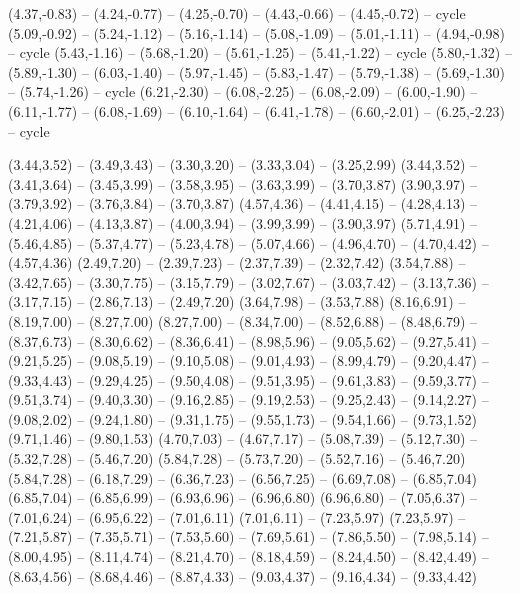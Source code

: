 \expandafter\def\csname geo:gebiet:HI\endcsname{
  (4.37,-0.83) -- (4.24,-0.77) -- (4.25,-0.70) -- (4.43,-0.66) -- (4.45,-0.72) -- cycle
  (5.09,-0.92) -- (5.24,-1.12) -- (5.16,-1.14) -- (5.08,-1.09) -- (5.01,-1.11) -- (4.94,-0.98) -- cycle
  (5.43,-1.16) -- (5.68,-1.20) -- (5.61,-1.25) -- (5.41,-1.22) -- cycle
  (5.80,-1.32) -- (5.89,-1.30) -- (6.03,-1.40) -- (5.97,-1.45) -- (5.83,-1.47) -- (5.79,-1.38) -- (5.69,-1.30) -- (5.74,-1.26) -- cycle
  (6.21,-2.30) -- (6.08,-2.25) -- (6.08,-2.09) -- (6.00,-1.90) -- (6.11,-1.77) -- (6.08,-1.69) -- (6.10,-1.64) -- (6.41,-1.78) -- (6.60,-2.01) -- (6.25,-2.23) -- cycle}
\def\GebietListe{AL,AR,AZ,CA,CO,CT,DC,DE,FL,GA,IA,ID,IL,IN,KS,KY,LA,MA,MD,ME,MI,MN,MO,MS,MT,NC,ND,NE,NH,NJ,NM,NV,NY,OH,OK,OR,PA,RI,SC,SD,TN,TX,UT,VA,VT,WA,WI,WV,WY,AK,HI}

\expandafter\def\csname geo:fluss:Colorado\endcsname{
  (3.44,3.52) -- (3.49,3.43) -- (3.30,3.20) -- (3.33,3.04) -- (3.25,2.99)
  (3.44,3.52) -- (3.41,3.64) -- (3.45,3.99) -- (3.58,3.95) -- (3.63,3.99) -- (3.70,3.87)
  (3.90,3.97) -- (3.79,3.92) -- (3.76,3.84) -- (3.70,3.87)
  (4.57,4.36) -- (4.41,4.15) -- (4.28,4.13) -- (4.21,4.06) -- (4.13,3.87) -- (4.00,3.94) -- (3.99,3.99) -- (3.90,3.97)
  (5.71,4.91) -- (5.46,4.85) -- (5.37,4.77) -- (5.23,4.78) -- (5.07,4.66) -- (4.96,4.70) -- (4.70,4.42) -- (4.57,4.36)}
\expandafter\def\csname geo:fluss:Columbia\endcsname{
  (2.49,7.20) -- (2.39,7.23) -- (2.37,7.39) -- (2.32,7.42)
  (3.54,7.88) -- (3.42,7.65) -- (3.30,7.75) -- (3.15,7.79) -- (3.02,7.67) -- (3.03,7.42) -- (3.13,7.36) -- (3.17,7.15) -- (2.86,7.13) -- (2.49,7.20)
  (3.64,7.98) -- (3.53,7.88)}
\expandafter\def\csname geo:fluss:Mississippi\endcsname{
  (8.16,6.91) -- (8.19,7.00) -- (8.27,7.00)
  (8.27,7.00) -- (8.34,7.00) -- (8.52,6.88) -- (8.48,6.79) -- (8.37,6.73) -- (8.30,6.62) -- (8.36,6.41) -- (8.98,5.96) -- (9.05,5.62) -- (9.27,5.41) -- (9.21,5.25) -- (9.08,5.19) -- (9.10,5.08) -- (9.01,4.93) -- (8.99,4.79) -- (9.20,4.47) -- (9.33,4.43) -- (9.29,4.25) -- (9.50,4.08) -- (9.51,3.95) -- (9.61,3.83) -- (9.59,3.77) -- (9.51,3.74) -- (9.40,3.30) -- (9.16,2.85) -- (9.19,2.53) -- (9.25,2.43) -- (9.14,2.27) -- (9.08,2.02) -- (9.24,1.80) -- (9.31,1.75) -- (9.55,1.73) -- (9.54,1.66) -- (9.73,1.52)
  (9.71,1.46) -- (9.80,1.53)}
\expandafter\def\csname geo:fluss:Missouri\endcsname{
  (4.70,7.03) -- (4.67,7.17) -- (5.08,7.39) -- (5.12,7.30) -- (5.32,7.28) -- (5.46,7.20)
  (5.84,7.28) -- (5.73,7.20) -- (5.52,7.16) -- (5.46,7.20)
  (5.84,7.28) -- (6.18,7.29) -- (6.36,7.23) -- (6.56,7.25) -- (6.69,7.08) -- (6.85,7.04)
  (6.85,7.04) -- (6.85,6.99) -- (6.93,6.96) -- (6.96,6.80)
  (6.96,6.80) -- (7.05,6.37) -- (7.01,6.24) -- (6.95,6.22) -- (7.01,6.11)
  (7.01,6.11) -- (7.23,5.97)
  (7.23,5.97) -- (7.21,5.87) -- (7.35,5.71) -- (7.53,5.60) -- (7.69,5.61) -- (7.86,5.50) -- (7.98,5.14) -- (8.00,4.95) -- (8.11,4.74) -- (8.21,4.70) -- (8.18,4.59) -- (8.24,4.50) -- (8.42,4.49) -- (8.63,4.56) -- (8.68,4.46) -- (8.87,4.33) -- (9.03,4.37) -- (9.16,4.34) -- (9.33,4.42)}
